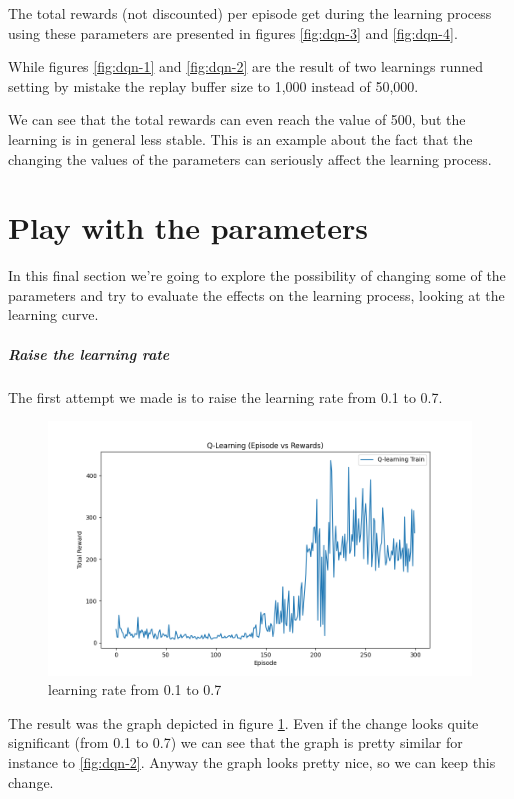 \documentclass{article}
\begin{document}
The total rewards (not discounted) per episode get during the learning process using these parameters are presented in
figures \ref{fig:dqn-3} and \ref{fig:dqn-4}.

While figures \ref{fig:dqn-1} and \ref{fig:dqn-2} are the result of two learnings runned 
setting by mistake the replay buffer size to 1,000 instead of 50,000.

We can see that the total rewards can even reach the value of 500, but the learning is in general less stable.
This is an example about the fact that the changing the values of the parameters can seriously affect the learning process.

\section{Play with the parameters}

In this final section we're going to explore the possibility of changing some of the parameters 
and try to evaluate the effects on the learning process, looking at the learning curve.

\subparagraph{Raise the learning rate}

The first attempt we made is to raise the learning rate from 0.1 to 0.7.

\begin{figure}
  \includegraphics[width=\linewidth]{DQN-0005.png}
  \caption{learning rate from 0.1 to 0.7}
  \label{fig:dqn-5}
\end{figure}

The result was the graph depicted in figure \ref{fig:dqn-5}.
Even if the change looks quite significant (from 0.1 to 0.7) we
can see that the graph is pretty similar for instance to \ref{fig:dqn-2}.
Anyway the graph looks pretty nice, so we can keep this change.
\end{document}
